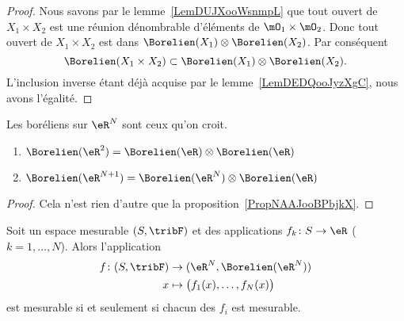 \begin{proof}
	Nous savons par le lemme~\ref{LemDUJXooWsnmpL} que tout ouvert de \( X_1\times X_2\) est une réunion dénombrable d'éléments de \( \mO_1\times\mO_2\). Donc tout ouvert de \( X_1\times X_2\) est dans \( \Borelien(X_1)\otimes \Borelien(X_2)\). Par conséquent
	\begin{equation}
		\Borelien(X_1\times X_2)\subset \Borelien(X_1)\otimes \Borelien(X_2).
	\end{equation}
	L'inclusion inverse étant déjà acquise par le lemme~\ref{LemDEDQooJyzXgC}, nous avons l'égalité.
\end{proof}

\begin{proposition}     \label{CorWOOOooHcoEEF}
	Les boréliens sur \( \eR^N\) sont ceux qu'on croit.
	\begin{enumerate}
		\item
		      \( \Borelien(\eR^2)=\Borelien(\eR)\otimes \Borelien(\eR)\)
		\item
		      \( \Borelien(\eR^{N+1})=\Borelien(\eR^N)\otimes \Borelien(\eR)\)
	\end{enumerate}
\end{proposition}

\begin{proof}
	Cela n'est rien d'autre que la proposition~\ref{PropNAAJooBPbjkX}.
\end{proof}

\begin{proposition}
	Soit un espace mesurable \( (S,\tribF)\) et des applications \( f_k\colon S\to \eR\) (\( k=1,\ldots, N\)). Alors l'application
	\begin{equation}
		\begin{aligned}
			f\colon (S,\tribF) & \to (\eR^N,\Borelien(\eR^N))              \\
			x                  & \mapsto \big( f_1(x),\ldots, f_N(x) \big)
		\end{aligned}
	\end{equation}
	est mesurable si et seulement si chacun des \( f_i\) est mesurable.
\end{proposition}

